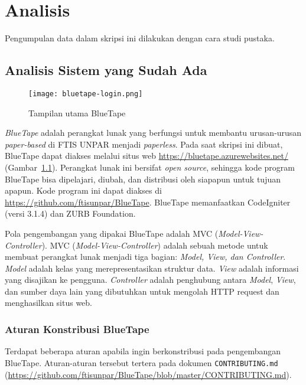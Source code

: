 
\chapter{Analisis}
\label{chap:analisis}
	Pengumpulan data dalam skripsi ini dilakukan dengan cara studi pustaka.

\section{Analisis Sistem yang Sudah Ada}
\label{sec:analisiskini}
\begin{figure}[H]
	\centering  
	\texttt{[image: bluetape-login.png]}  
	\caption[Tampilan utama BlueTape]{Tampilan utama BlueTape} 
	\label{fig:bluetape-login} 
\end{figure}

	\textit{BlueTape} adalah perangkat lunak yang berfungsi untuk membantu urusan-urusan \textit{paper-based} di FTIS UNPAR menjadi \textit{paperless}. Pada saat skripsi ini dibuat, BlueTape dapat diakses melalui situs web \url{https://bluetape.azurewebsites.net/} (Gambar~\ref{fig:bluetape-login}). Perangkat lunak ini bersifat \textit{open source}, sehingga kode program BlueTape bisa dipelajari, diubah, dan distribusi oleh siapapun untuk tujuan apapun. Kode program ini dapat diakses di \url{https://github.com/ftisunpar/BlueTape}. BlueTape memanfaatkan CodeIgniter (versi 3.1.4) dan ZURB Foundation.
	
	Pola pengembangan yang dipakai BlueTape adalah MVC (\textit{Model-View-Controller}). MVC (\textit{Model-View-Controller}) adalah sebuah metode untuk membuat perangkat lunak menjadi tiga bagian: \textit{Model, View, dan Controller}. \textit{Model} adalah kelas yang merepresentasikan struktur data. \textit{View} adalah informasi yang disajikan ke pengguna. \textit{Controller} adalah penghubung antara \textit{Model}, \textit{View}, dan sumber daya lain yang dibutuhkan untuk mengolah HTTP request dan menghasilkan situs web.

\subsection{Aturan Konstribusi BlueTape}
	Terdapat beberapa aturan apabila ingin berkonstribusi pada pengembangan BlueTape. Aturan-aturan tersebut tertera pada dokumen \texttt{CONTRIBUTING.md} (\url{https://github.com/ftisunpar/BlueTape/blob/master/CONTRIBUTING.md}).

